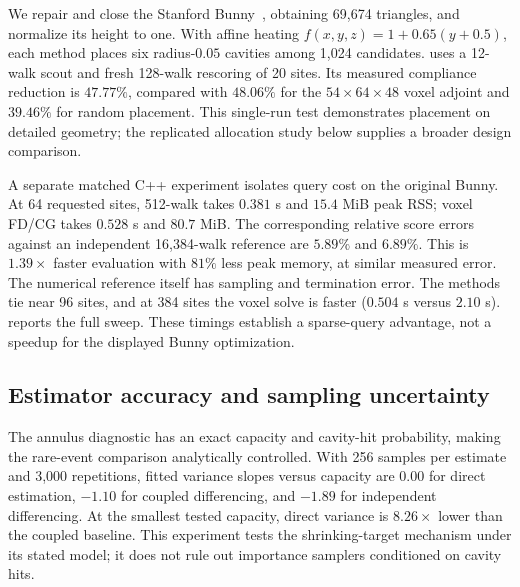 We repair and close the Stanford Bunny~\cite{stanford1994bunny}, obtaining 69,674 triangles, and normalize its height to one. With affine heating $f(x,y,z)=1+0.65(y+0.5)$, each method places six radius-$0.05$ cavities among 1,024 candidates. \method{} uses a 12-walk scout and fresh 128-walk rescoring of 20 sites. Its measured compliance reduction is $47.77\%$, compared with $48.06\%$ for the $54\times64\times48$ voxel adjoint and $39.46\%$ for random placement. This single-run test demonstrates placement on detailed geometry; the replicated allocation study below supplies a broader design comparison.

A separate matched C++ experiment isolates query cost on the original Bunny. At 64 requested sites, 512-walk \method{} takes $0.381$ s and $15.4$ MiB peak RSS; voxel FD/CG takes $0.528$ s and $80.7$ MiB. The corresponding relative score errors against an independent 16,384-walk reference are $5.89\%$ and $6.89\%$. This is $1.39\times$ faster evaluation with $81\%$ less peak memory, at similar measured error. The numerical reference itself has sampling and termination error. The methods tie near 96 sites, and at 384 sites the voxel solve is faster ($0.504$ s versus $2.10$ s).  reports the full sweep. These timings establish a sparse-query advantage, not a speedup for the displayed Bunny optimization.



\subsection{Estimator accuracy and sampling uncertainty}

The annulus diagnostic has an exact capacity and cavity-hit probability, making the rare-event comparison analytically controlled. With 256 samples per estimate and 3,000 repetitions, fitted variance slopes versus capacity are $0.00$ for direct estimation, $-1.10$ for coupled differencing, and $-1.89$ for independent differencing. At the smallest tested capacity, direct variance is $8.26\times$ lower than the coupled baseline. This experiment tests the shrinking-target mechanism under its stated model; it does not rule out importance samplers conditioned on cavity hits.

